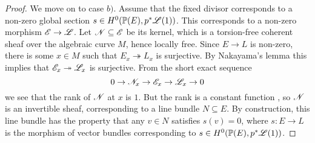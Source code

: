 \documentclass[A4paper, 12pt, british, reqno]{amsart}
\begin{document}
\begin{prop}
\begin{proof}
	We move on to case $b)$.
	Assume that the fixed divisor corresponds to a non-zero global section $s\in H^{0}(\mathbb{P}(E),p^{*}\mathscr{L}(1))$.
	This corresponds to a non-zero morphism $\mathscr{E}\to \mathscr{L}$.
	Let $\mathscr{N}\subseteq \mathscr{E}$ be its kernel, which is a torsion-free coherent sheaf over the algebraic curve $M$, hence locally free.
	Since $E\to L$ is non-zero, there is some $x\in M$ such that $E_{x}\twoheadrightarrow L_{x}$ is surjective.
	By Nakayama's lemma this implies that $\mathscr{E}_{x}\twoheadrightarrow \mathscr{L}_{x}$ is surjective.
	From the short exact sequence
	\[ 0\to \mathscr{N}_{x}\to \mathscr{E}_{x}\to \mathscr{L}_{x} \to 0 \]
	we see that the rank of $\mathscr{N}$ at $x$ is $1$.
	But the rank is a constant function \cite[Exercise II.5.8]{har77}, so $\mathscr{N}$ is an invertible sheaf, corresponding to a line bundle $N\subseteq E$.
	By construction, this line bundle has the property that any $v\in N$ satisfies $s(v)=0$, where $s\colon E\to L$ is the morphism of vector bundles corresponding to $s\in H^{0}(\mathbb{P}(E),p^{*}\mathscr{L}(1))$.
    \end{proof}
\end{prop}



\vspace{0.3cm}
\end{document}
